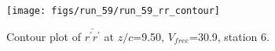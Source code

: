 \begin{figure}[H]
\centering
\texttt{[image: figs/run\_59/run\_59\_rr\_contour]}
\caption{Contour plot of $\overline{r^\prime r^\prime}$ at $z/c$=9.50, $V_{free}$=30.9, station 6.}
\end{figure}


